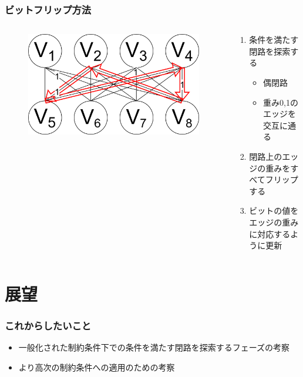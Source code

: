 \begin{frame}
  \frametitle{ビットフリップ方法}
    \begin{columns}
      \begin{column}{0.47\linewidth}
        \begin{figure}
          \includegraphics[width=1\linewidth]{data/kanzen2ji_path.png}       
        \end{figure}
      \end{column}
      \begin{column}{0.47\linewidth}
          \begin{enumerate}
            \item 条件を満たす閉路を探索する
            \begin{itemize}
              \item 偶閉路
              \item 重み0,1のエッジを交互に通る
            \end{itemize}
            \item 閉路上のエッジの重みをすべてフリップする
            \item ビットの値をエッジの重みに対応するように更新
          \end{enumerate}
      \end{column}
    \end{columns}
\end{frame}

\section{展望}
\begin{frame}
  \frametitle{これからしたいこと}
  \begin{itemize}
    \item 一般化された制約条件下での条件を満たす閉路を探索するフェーズの考察
    \item より高次の制約条件への適用のための考察
  \end{itemize}
\end{frame}

